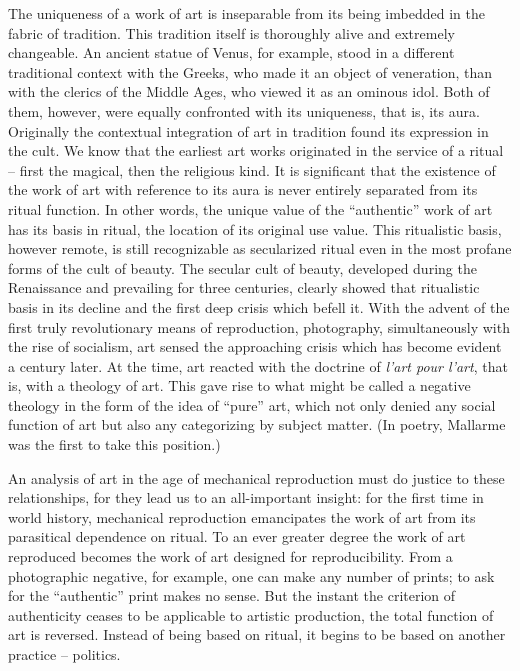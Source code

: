 \documentclass[11pt, letterpaper]{article}
\begin{document}
The uniqueness of a work of art is inseparable from its being imbedded in the
fabric of tradition. This tradition itself is thoroughly alive and extremely
changeable. An ancient statue of Venus, for example, stood in a different
traditional context with the Greeks, who made it an object of veneration, than
with the clerics of the Middle Ages, who viewed it as an ominous idol. Both of
them, however, were equally confronted with its uniqueness, that is, its aura.
Originally the contextual integration of art in tradition found its expression
in the cult. We know that the earliest art works originated in the service of a
ritual – first the magical, then the religious kind. It is significant that the
existence of the work of art with reference to its aura is never entirely
separated from its ritual function. In other words, the unique value of the
“authentic” work of art has its basis in ritual, the location of its original
use value. This ritualistic basis, however remote, is still recognizable as
secularized ritual even in the most profane forms of the cult of beauty. The
secular cult of beauty, developed during the Renaissance and prevailing for
three centuries, clearly showed that ritualistic basis in its decline and the
first deep crisis which befell it. With the advent of the first truly
revolutionary means of reproduction, photography, simultaneously with the rise
of socialism, art sensed the approaching crisis which has become evident a
century later. At the time, art reacted with the doctrine of \textit{l’art pour
l’art}, that is, with a theology of art. This gave rise to what might be called
a negative theology in the form of the idea of “pure” art, which not only
denied any social function of art but also any categorizing by subject matter.
(In poetry, Mallarme was the first to take this position.)

An analysis of art in the age of mechanical reproduction must do justice to
these relationships, for they lead us to an all-important insight: for the
first time in world history, mechanical reproduction emancipates the work of
art from its parasitical dependence on ritual. To an ever greater degree the
work of art reproduced becomes the work of art designed for reproducibility.
From a photographic negative, for example, one can make any number of prints;
to ask for the “authentic” print makes no sense. But the instant the criterion
of authenticity ceases to be applicable to artistic production, the total
function of art is reversed. Instead of being based on ritual, it begins to be
based on another practice – politics.
\end{document}

